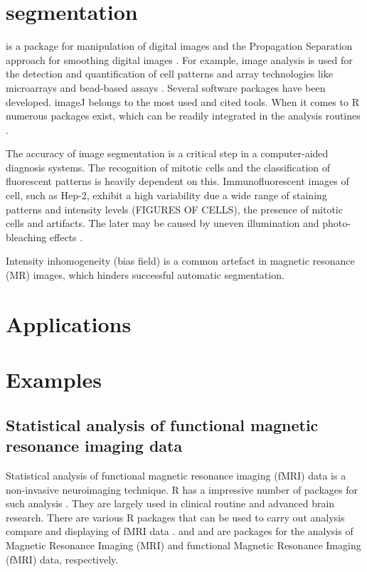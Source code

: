 \section{segmentation}

\citep{holmes_interactive_2009}

 is a package for manipulation of digital images and the 
Propagation Separation approach for smoothing digital images \citep{polzehl_adaptive_2007}.
For example, image analysis is used for the detection and quantification of 
cell patterns and array technologies like microarrays and bead-based assays 
\citep{dunning_beadarray:_2006, rodiger_highly_2013, willitzki_new_2012, willitzki_fully_2013}.
Several software packages have been developed. imageJ belongs to the most 
used and cited tools. When it comes to R numerous packages exist, which can 
be readily integrated in the analysis routines \citep{schultze_illuminagui_2007, frery_introduction_2013}.

The accuracy of image segmentation is a critical step in a computer-aided 
diagnosis systems. The recognition of mitotic cells and the classification of 
fluorescent patterns is heavily dependent on this. Immunofluorescent images 
of cell, such as Hep-2, exhibit a high variability due a wide range of staining 
patterns and intensity levels (FIGURES OF CELLS), the presence of mitotic 
cells and  artifacts. The later may be caused by uneven illumination and 
photo-bleaching effects \citep{tonti_automated_2015}.

Intensity inhomogeneity (bias field) is a common artefact in magnetic resonance 
(MR) images, which hinders successful automatic segmentation. \citep{ivanovska_efficient_2016}

\section{Applications}

\section{Examples}
\subsection{Statistical analysis of functional magnetic resonance imaging data}

Statistical analysis of functional magnetic resonance imaging (fMRI) data  is a 
non-invasive neuroimaging technique. R has a impressive number of packages for 
such analysis \citep{tabelow_special_2011}. They are largely used in clinical 
routine and advanced brain research. There are various R packages that can be 
used to carry out analysis compare and displaying of fMRI data \citep{muschelli-sweeney-crainiceanu:2014}.
 \citep{bordier_temporal_2011, marchini_analyzefmri:_2002} and  
\citep{polzehl_fmri:_2007} and are packages for the analysis of Magnetic 
Resonance Imaging (MRI) and functional Magnetic Resonance Imaging (fMRI) data, 
respectively.  \citep{philipsen_pet:_2010} 

